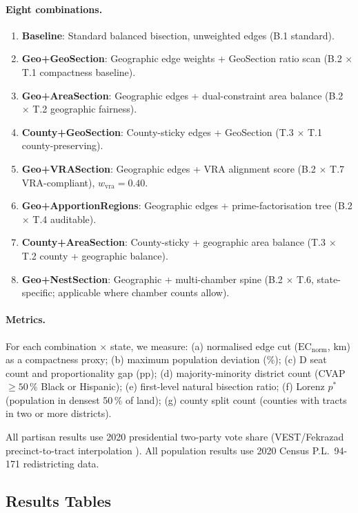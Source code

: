 \paragraph{Eight combinations.}
\begin{enumerate}
  \item \textbf{Baseline}: Standard balanced bisection, unweighted edges
    (B.1 standard).
  \item \textbf{Geo+GeoSection}: Geographic edge weights + GeoSection ratio
    scan (B.2 $\times$ T.1 compactness baseline).
  \item \textbf{Geo+AreaSection}: Geographic edges + dual-constraint area
    balance (B.2 $\times$ T.2 geographic fairness).
  \item \textbf{County+GeoSection}: County-sticky edges + GeoSection
    (T.3 $\times$ T.1 county-preserving).
  \item \textbf{Geo+VRASection}: Geographic edges + VRA alignment score
    (B.2 $\times$ T.7 VRA-compliant), $w_\text{vra}=0.40$.
  \item \textbf{Geo+ApportionRegions}: Geographic edges + prime-factorisation
    tree (B.2 $\times$ T.4 auditable).
  \item \textbf{County+AreaSection}: County-sticky + geographic area balance
    (T.3 $\times$ T.2 county + geographic balance).
  \item \textbf{Geo+NestSection}: Geographic + multi-chamber spine
    (B.2 $\times$ T.6, state-specific; applicable where chamber counts allow).
\end{enumerate}

\paragraph{Metrics.}
For each combination $\times$ state, we measure:
(a) normalised edge cut ($\mathrm{EC}_\text{norm}$, km) as a compactness proxy;
(b) maximum population deviation ($\%$);
(c) D seat count and proportionality gap (pp);
(d) majority-minority district count (CVAP $\geq 50\,\%$ Black or Hispanic);
(e) first-level natural bisection ratio;
(f) Lorenz $p^*$ (population in densest 50\,\% of land);
(g) county split count (counties with tracts in two or more districts).

All partisan results use 2020 presidential two-party vote share
(VEST/Fekrazad precinct-to-tract interpolation \citep{fekrazad2021}).
All population results use 2020 Census P.L.\ 94-171 redistricting data.

\subsection{Results Tables}

